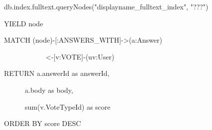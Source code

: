  db.\textcolor{mygreen}{index}.fulltext.queryNodes(\textcolor{Dandelion}{"displayname\_fulltext\_index"}, \textcolor{Dandelion}{"???"})\par
\textcolor{mygreen}{YIELD node}\par
\textcolor{mygreen}{MATCH} (node)-[:ANSWERS\_WITH]->(a:Answer)\par
~~~~~~~~~~~~<-[v:VOTE]-(uv:User)\par
\textcolor{mygreen}{RETURN} a.answerId as answerId,\par
~~~~~~a.body as body, \par
~~~~~~sum(v.VoteTypeId) as score \par
\textcolor{mygreen}{ORDER BY} score \textcolor{mygreen}{DESC}

